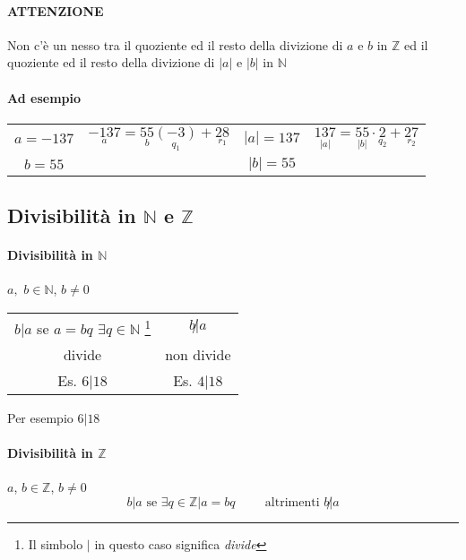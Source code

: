     \paragraph{ATTENZIONE}
    {\color{red}Non c'è un nesso tra il quoziente ed il resto della divizione di $a$ e $b$ in $\mathbb{Z}$ ed il quoziente
    ed il resto della divizione di $|a|$ e $|b|$ in $\mathbb{N}$}
    \paragraph{Ad esempio}
    
    \begin{center}
        \begin{tabular}{ c c | c c }
            $a=-137$ &
            $\underset{a}{-137}=\underset{b}{55}\underset{q_1}{(-3)}+\underset{r_1}{28}$ & 
            $|a|=137$ & 
            $\underset{|a|}{137}=\underset{|b|}{55}\cdot\underset{q_2}{2}+\underset{r_2}{27}$\\
            $b=55$ & & $|b|=55$
        \end{tabular}
    \end{center}
    \subsection{Divisibilità in $\mathbb{N}$ e $\mathbb{Z}$}
    \paragraph{Divisibilità in $\mathbb{N}$} $a,$ $b\in\mathbb{N}$, $b\neq 0$ \hspace{1cm} 
    \begin{center}
        \begin{tabular}{c c}
            $b|a$ se $a=bq$ $\exists q\in\mathbb{N}$
            \footnote{Il simbolo $|$ in questo caso significa 
            \textit{divide}} &
            $b\not| a$\\
            divide & non divide\\
            Es. $6|18$ & Es. $4|18$
        \end{tabular}
    \end{center}
    Per esempio $6|18$
    \paragraph{Divisibilità in $\mathbb{Z}$} 
    $a$, $b\in\mathbb{Z}$, $b\neq 0$
            $$b|a  \textrm{ se } \exists q\in\mathbb{Z}|a=bq\hspace{1cm}\textrm{altrimenti }b\not| a$$ 
